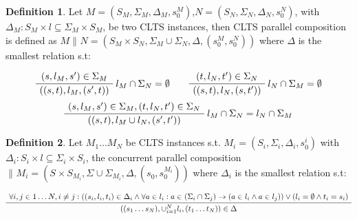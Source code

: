 \documentclass{article}
\theoremstyle{definition}
\newtheorem{definition}{Definition}[section]
\newcommand{\automaton}[1]{$#1 = (S_{#1}, \Sigma_{#1}, \Delta_{#1}, s_{0}^{#1})$}
\newcommand{\ltsComposition}[3]{$#1 \parallel_{#3} #2 = (S_{#1}\times S_{#2}, \Sigma_{#1} \cup \Sigma_{#2}, \Delta, (s_{0}^{#1},s_{0}^{#2}))$}
\begin{document}
\begin{definition} 
	Let \automaton{M},\automaton{N}, with $\Delta_M : S_M \times l \subseteq \Sigma_M \times S_M$, be two CLTS instances, then CLTS parallel composition is defined as \ltsComposition{M}{N}{} where $\Delta$ is the smallest relation s.t:
	\begin{center}
		\begin{equation}
			\AxiomC{$(s, l_M, s') \in \Sigma_M $}\RightLabel{$l_M \cap \Sigma_N = \emptyset$}
			\UnaryInfC{$((s,t),l_M,(s',t))$}
			\DisplayProof
			\quad\quad
			\AxiomC{$(t, l_N, t') \in \Sigma_N $}\RightLabel{$l_N \cap \Sigma_M = \emptyset$}
			\UnaryInfC{$((s,t),l_N,(s,t'))$}
			\DisplayProof
		\end{equation}		
		\begin{equation}
		\AxiomC{$(s, l_M, s') \in \Sigma_M,(t, l_N, t') \in \Sigma_N  $}\RightLabel{$l_M \cap \Sigma_N = l_N \cap \Sigma_M$}
		\UnaryInfC{$((s,t),l_M \cup l_N,(s',t'))$}
		\DisplayProof
		\end{equation}	
	\end{center}
\end{definition}

\begin{definition} 
	Let $M_1 \ldots M_N$ be CLTS instances s.t. $M_i= (S_{i}, \Sigma_{i}, \Delta_{i}, s_{0}^{i})$ with $\Delta_i : S_i \times l \subseteq \Sigma_i \times S_i$, the concurrent parallel composition \ltsComposition{}{M_i}{} where $\Delta_i$ is the smallest relation s.t:
	\begin{center}
		\begin{equation}
		\AxiomC{$\forall i,j \in 1 \ldots N, i \neq j: ((s_i, l_i, t_i) \in \Delta_i \wedge \forall a \in l_i : a \in (\Sigma_i \cap \Sigma_j) \rightarrow (a \in l_i \wedge a \in l_j)) \vee (l_i = \emptyset \wedge t_i = s_i)$}
		\UnaryInfC{$((s_1 \ldots s_N),\cup_{i=1}^{N}l_i,(t_1 \ldots t_N)) \in \Delta$}
		\DisplayProof
		\end{equation}		
	\end{center}
\end{definition}
\end{document}
